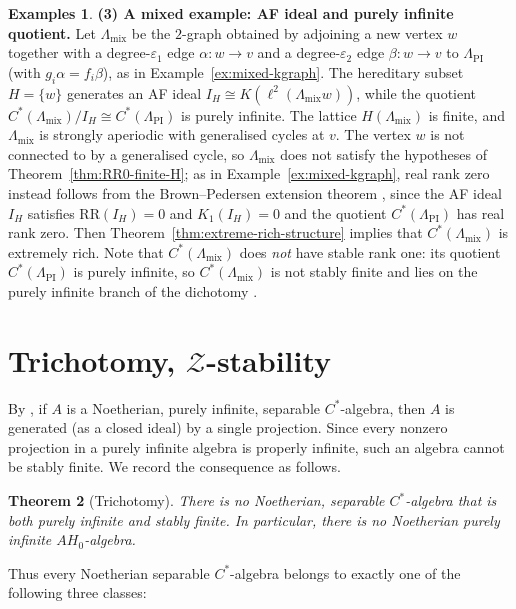 \documentclass[12pt]{amsart}
\theoremstyle{plain}
\newtheorem{theorem}{Theorem}[section]
\theoremstyle{definition}
\newtheorem{examples}[theorem]{Examples}
\theoremstyle{remark}
\begin{document}
\begin{examples}
\noindent\textbf{(3) A mixed example: AF ideal and purely infinite quotient.}
Let $\Lambda_{\mathrm{mix}}$ be the $2$-graph obtained by adjoining a new
vertex $w$ together with a degree-$\varepsilon_1$ edge $\alpha:w\to v$ and a
degree-$\varepsilon_2$ edge $\beta:w\to v$ to $\Lambda_{\mathrm{PI}}$
(with $g_i\alpha=f_i\beta$), as in Example~\ref{ex:mixed-kgraph}. The
hereditary subset $H=\{w\}$ generates an AF ideal
$I_H\cong K(\ell^2(\Lambda_{\mathrm{mix}}w))$, while the quotient
$C^*(\Lambda_{\mathrm{mix}})/I_H\cong C^*(\Lambda_{\mathrm{PI}})$ is purely
infinite. The lattice $H(\Lambda_{\mathrm{mix}})$ is finite, and
$\Lambda_{\mathrm{mix}}$ is strongly aperiodic with generalised cycles at $v$.
The vertex $w$ is not connected to by a generalised cycle, so
$\Lambda_{\mathrm{mix}}$ does not satisfy the hypotheses of
Theorem~\ref{thm:RR0-finite-H}; as in Example~\ref{ex:mixed-kgraph}, real rank
zero instead follows from the Brown--Pedersen extension theorem
\cite[Theorem~3.14]{BP}, since the AF ideal $I_H$ satisfies
$\mathrm{RR}(I_H)=0$ and $K_1(I_H)=0$ and the quotient
$C^*(\Lambda_{\mathrm{PI}})$ has real rank zero. Then
Theorem~\ref{thm:extreme-rich-structure} implies that
$C^*(\Lambda_{\mathrm{mix}})$ is extremely rich. Note that
$C^*(\Lambda_{\mathrm{mix}})$ does \emph{not} have stable rank one: its
quotient $C^*(\Lambda_{\mathrm{PI}})$ is purely infinite, so
$C^*(\Lambda_{\mathrm{mix}})$ is not stably finite and lies on the purely
infinite branch of the dichotomy \cite[Corollary~2.9]{BP3}.
\end{examples}

\section{Trichotomy, $\mathcal{Z}$-stability}\label{sec:trichotomy}

By \cite[Theorem~2.3]{PRA2}, if $A$ is a Noetherian, purely infinite, separable
$C^*$-algebra, then $A$ is generated (as a closed ideal) by a single projection.
Since every nonzero projection in a purely infinite algebra is properly infinite,
such an algebra cannot be stably finite. We record the consequence as follows.

\begin{theorem}[Trichotomy]\label{thm:trichotomy}
There is no Noetherian, separable $C^*$-algebra that is both purely infinite
and stably finite. In particular, there is no Noetherian purely infinite
$AH_0$-algebra.
\end{theorem}

Thus every Noetherian separable $C^*$-algebra belongs to exactly one of the
following three classes:
\end{document}
